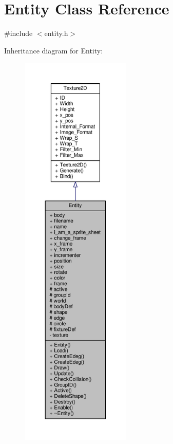 \hypertarget{classEntity}{}\section{Entity Class Reference}
\label{classEntity}


{\ttfamily \#include $<$entity.\+h$>$}



Inheritance diagram for Entity\+:
\nopagebreak
\begin{figure}[H]
\begin{center}
\leavevmode
\includegraphics[height=550pt]{classEntity__inherit__graph}
\end{center}
\end{figure}


